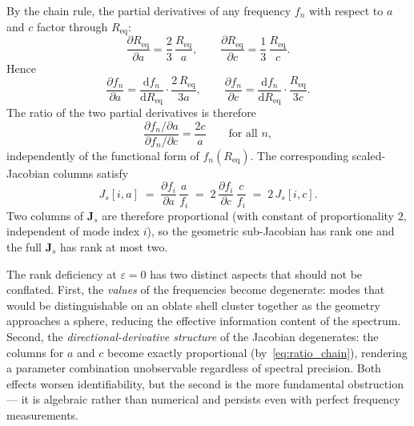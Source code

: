 \begin{pf}
By the chain rule, the partial derivatives of any frequency $f_n$ with respect
to $a$ and $c$ factor through $R_\mathrm{eq}$:
\begin{equation}\label{eq:dreq_da}
  \frac{\partial R_\mathrm{eq}}{\partial a}
  = \frac{2}{3}\,\frac{R_\mathrm{eq}}{a},
  \qquad
  \frac{\partial R_\mathrm{eq}}{\partial c}
  = \frac{1}{3}\,\frac{R_\mathrm{eq}}{c}.
\end{equation}
Hence
\begin{equation}\label{eq:dfn_chain}
  \frac{\partial f_n}{\partial a}
  = \frac{\mathrm{d} f_n}{\mathrm{d} R_\mathrm{eq}}
    \cdot \frac{2\,R_\mathrm{eq}}{3a},
  \qquad
  \frac{\partial f_n}{\partial c}
  = \frac{\mathrm{d} f_n}{\mathrm{d} R_\mathrm{eq}}
    \cdot \frac{R_\mathrm{eq}}{3c}.
\end{equation}
The ratio of the two partial derivatives is therefore
\begin{equation}\label{eq:ratio_chain}
  \frac{\partial f_n / \partial a}
       {\partial f_n / \partial c}
  = \frac{2c}{a}
  \qquad \text{for all } n,
\end{equation}
independently of the functional form of $f_n(R_\mathrm{eq})$.  The
corresponding scaled-Jacobian columns satisfy
\begin{equation}
  J_s[i,a] \;=\; \frac{\partial f_i}{\partial a}\,\frac{a}{f_i}
  \;=\; 2\,\frac{\partial f_i}{\partial c}\,\frac{c}{f_i}
  \;=\; 2\,J_s[i,c].
\end{equation}
Two columns of $\mathbf{J}_s$ are therefore proportional (with constant of
proportionality $2$, independent of mode index $i$), so the geometric
sub-Jacobian has rank one and the full $\mathbf{J}_s$ has rank at most two.
\end{pf}

\begin{remark}
The rank deficiency at $\varepsilon = 0$ has two distinct aspects that should
not be conflated.  First, the \emph{values} of the frequencies become
degenerate: modes that would be distinguishable on an oblate shell cluster
together as the geometry approaches a sphere, reducing the effective
information content of the spectrum.  Second, the \emph{directional-derivative
structure} of the Jacobian degenerates: the columns for $a$ and $c$ become
exactly proportional (by~\eqref{eq:ratio_chain}), rendering a parameter
combination unobservable regardless of spectral precision.  Both effects
worsen identifiability, but the second is the more fundamental obstruction
--- it is algebraic rather than numerical and persists even with perfect
frequency measurements.
\end{remark}

